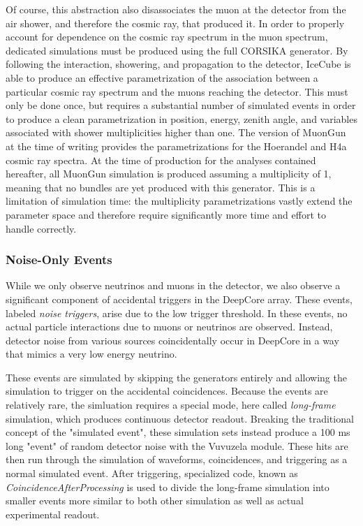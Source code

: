 Of course, this abstraction also disassociates the muon at the detector from the air shower, and therefore the cosmic ray, that produced it.
In order to properly account for dependence on the cosmic ray spectrum in the muon spectrum, dedicated simulations must be produced using the full CORSIKA generator. 
By following the interaction, showering, and propagation to the detector, IceCube is able to produce an effective parametrization of the association between a particular cosmic ray spectrum and the muons reaching the detector.
This must only be done once, but requires a substantial number of simulated events in order to produce a clean parametrization in position, energy, zenith angle, and variables associated with shower multiplicities higher than one.
The version of MuonGun at the time of writing provides the parametrizations for the Hoerandel and H4a cosmic ray spectra. 
At the time of production for the analyses contained hereafter, all MuonGun simulation is produced assuming a multiplicity of 1, meaning that no bundles are yet produced with this generator.
This is a limitation of simulation time: the multiplicity parametrizations vastly extend the parameter space and therefore require significantly more time and effort to handle correctly.

\label{subsubsec:noise_triggers}
\subsubsection{Noise-Only Events}
While we only observe neutrinos and muons in the detector, we also observe a significant component of accidental triggers in the DeepCore array.
These events, labeled \emph{noise triggers}, arise due to the low trigger threshold. 
In these events, no actual particle interactions due to muons or neutrinos are observed.
Instead, detector noise from various sources coincidentally occur in DeepCore in a way that mimics a very low energy neutrino.

These events are simulated by skipping the generators entirely and allowing the simulation to trigger on the accidental coincidences.
Because the events are relatively rare, the simluation requires a special mode, here called \emph{long-frame} simulation, which produces continuous detector readout. 
Breaking the traditional concept of the "simulated event", these simulation sets instead produce a 100 ms long "event" of random detector noise with the Vuvuzela module. 
These hits are then run through the simulation of waveforms, coincidences, and triggering as a normal simulated event.
After triggering, specialized code, known as \emph{CoincidenceAfterProcessing} is used to divide the long-frame simulation into smaller events more similar to both other simulation as well as actual experimental readout.

